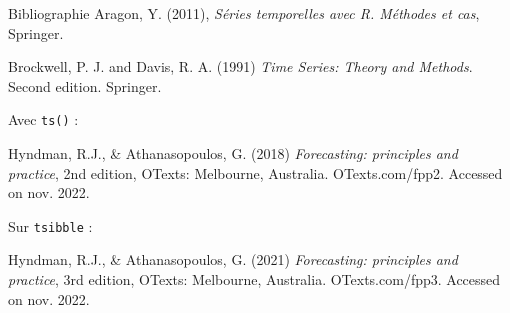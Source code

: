 \documentclass[10pt,xcolor=table,color={dvipsnames,usenames},ignorenonframetext,usepdftitle=false,french]{beamer}
\begin{document}
\begin{frame}[fragile]{Bibliographie}
\protect\hypertarget{bibliographie}{}
Aragon, Y. (2011), \emph{Séries temporelles avec R. Méthodes et cas},
Springer.

Brockwell, P. J. and Davis, R. A. (1991) \emph{Time Series: Theory and
Methods}. Second edition. Springer.

Avec \texttt{ts()} :

Hyndman, R.J., \& Athanasopoulos, G. (2018) \emph{Forecasting:
principles and practice}, 2nd edition, OTexts: Melbourne, Australia.
OTexts.com/fpp2. Accessed on nov. 2022.

Sur \texttt{tsibble} :

Hyndman, R.J., \& Athanasopoulos, G. (2021) \emph{Forecasting:
principles and practice}, 3rd edition, OTexts: Melbourne, Australia.
OTexts.com/fpp3. Accessed on nov. 2022.
\end{frame}
\end{document}
